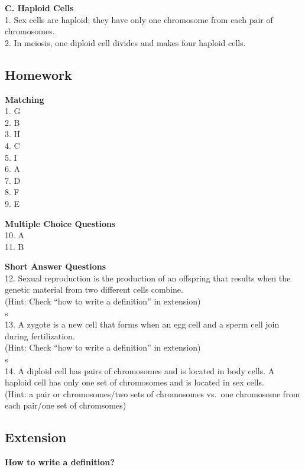 \documentclass[
]{book}
\begin{document}
\textbf{C. Haploid Cells}\\
1. Sex cells are {haploid}; they have only one chromosome from each pair of chromosomes.\\
2. In {meiosis}, one diploid cell divides and makes four haploid cells.

\hypertarget{homework}{%
\subsection{Homework}\label{homework}}

\textbf{Matching}\\
1. G\\
2. B\\
3. H\\
4. C\\
5. I\\
6. A\\
7. D\\
8. F\\
9. E

\textbf{Multiple Choice Questions}\\
10. A\\
11. B

\textbf{Short Answer Questions}\\
12. Sexual reproduction is the {production of an offspring} that results when the genetic material from two different cells combine.\\
(Hint: Check ``how to write a definition'' in extension)\\
{s}\\
13. A zygote is {a new cell} that forms when an egg cell and a sperm cell join during fertilization.\\
(Hint: Check ``how to write a definition'' in extension)\\
{s}\\
14. A diploid cell has {pairs of chromosomes} and is located in body cells. A haploid cell has only {one set of chromosomes} and is located in sex cells.\\
(Hint: a pair or chromosomes/two sets of chromosomes vs.~one chromosome from each pair/one set of chromsomes)

\hypertarget{extension}{%
\subsection{Extension}\label{extension}}

\textbf{How to write a definition?}
\end{document}
